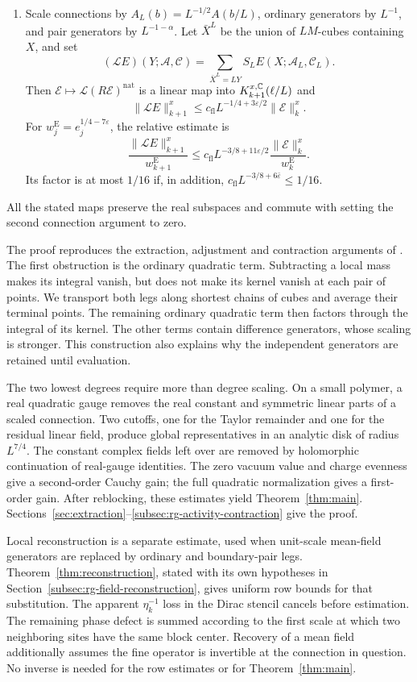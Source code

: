 \begin{theorem}
\begin{enumerate}[label=\textup{(\roman*)},leftmargin=*]
\item Scale connections by
\(A_L(b)=L^{-1/2}A(b/L)\), ordinary generators by \(L^{-1}\),
and pair generators by \(L^{-1-\alpha}\).
Let \(\bar X^L\) be the union of \(LM\)-cubes containing \(X\), and set
\[
 (\mathcal LE)(Y;\mathscr A,\mathscr C)
       =\sum_{\bar X^L=LY}S_LE(X;\mathscr A_L,\mathscr C_L).
\]
Then \(\mathscr E\mapsto\mathcal L(R\mathscr E)^{\mathrm{nat}}\)
is a linear map into \(K_{k+1}^{x,\mathbb C}(\ell/L)\) and
\[
 \|\mathcal LE\|_{k+1}^x
       \le c_{\mathrm{fl}}L^{-1/4+3\varepsilon/2}\|\mathscr E\|_k^x.
\]
For \(w_j^{\mathrm E}=e_j^{1/4-7\varepsilon}\), the relative estimate is
\[
 \frac{\|\mathcal LE\|_{k+1}^x}{w_{k+1}^{\mathrm E}}
 \le c_{\mathrm{fl}}L^{-3/8+11\varepsilon/2}
                 \frac{\|\mathscr E\|_k^x}{w_k^{\mathrm E}}.
\]
Its factor is at most \(1/16\) if, in addition,
\(c_{\mathrm{fl}}L^{-3/8+6\bar\varepsilon}\le1/16\).
\end{enumerate}
All the stated maps preserve the real subspaces and commute with
setting the second connection argument to zero.
\end{theorem}

The proof reproduces the extraction, adjustment and contraction
arguments of \cite[\S12]{QED3Manuscript}. The first obstruction is
the ordinary quadratic term. Subtracting a local mass makes its
integral vanish, but does not make its kernel vanish at each pair
of points. We transport both legs along shortest chains of cubes
and average their terminal points. The remaining ordinary
quadratic term then factors through the integral of its kernel.
The other terms contain difference generators, whose scaling is
stronger. This construction also explains why the independent
generators are retained until evaluation.

The two lowest degrees require more than degree scaling. On a
small polymer, a real quadratic gauge removes the real constant
and symmetric linear parts of a scaled connection. Two cutoffs,
one for the Taylor remainder and one for the residual linear
field, produce global representatives in an analytic disk of
radius \(L^{7/4}\). The constant complex fields left over are
removed by holomorphic continuation of real-gauge identities.
The zero vacuum value and charge evenness give a second-order
Cauchy gain; the full quadratic normalization gives a first-order
gain. After reblocking, these estimates yield Theorem~\ref{thm:main}.
Sections~\ref{sec:extraction}--\ref{subsec:rg-activity-contraction}
give the proof.

Local reconstruction is a separate estimate, used when unit-scale
mean-field generators are replaced by ordinary and boundary-pair
legs. Theorem~\ref{thm:reconstruction}, stated with its own
hypotheses in Section~\ref{subsec:rg-field-reconstruction}, gives
uniform row bounds for that substitution. The apparent
\(\eta_k^{-1}\) loss in the Dirac stencil cancels before estimation.
The remaining phase defect is summed according to the first scale
at which two neighboring sites have the same block center. Recovery
of a mean field additionally assumes the fine operator is invertible
at the connection in question. No inverse is needed for the row
estimates or for Theorem~\ref{thm:main}.

